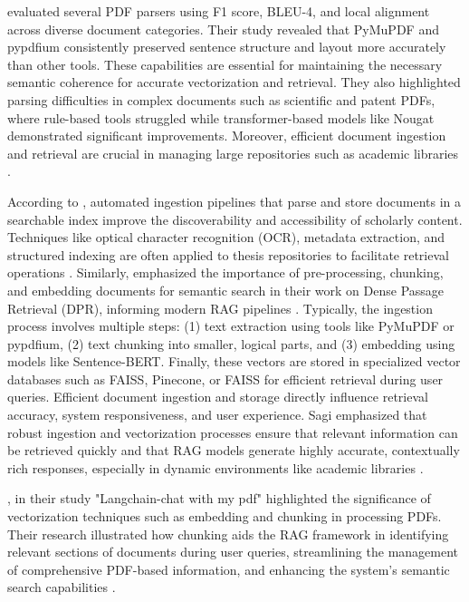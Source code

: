 \begin{refsection}
\bigbreak
\hspace{0.4cm} \citeauthor{adhikari2024comparative} \citeyear{adhikari2024comparative} evaluated several PDF parsers using F1 score, BLEU-4, and local alignment across diverse document categories. Their study revealed that PyMuPDF and pypdfium consistently preserved sentence structure and layout more accurately than other tools. These capabilities are essential for maintaining the necessary semantic coherence for accurate vectorization and retrieval. They also highlighted parsing difficulties in complex documents such as scientific and patent PDFs, where rule-based tools struggled while transformer-based models like Nougat demonstrated significant improvements. Moreover, efficient document ingestion and retrieval are crucial in managing large repositories such as academic libraries \cite{adhikari2024comparative}.

\hspace{0.4cm}According to \citeauthor{zhang2023automated} \citeyear{zhang2023automated}, automated ingestion pipelines that parse and store documents in a searchable index improve the discoverability and accessibility of scholarly content. 
\newpage
\clearpage
Techniques like optical character recognition (OCR), metadata extraction, and structured indexing are often applied to thesis repositories to facilitate retrieval operations \cite{zhang2023automated}. Similarly, \citeauthor{karpukhin2020dense} \citeyear{karpukhin2020dense} emphasized the importance of pre-processing, chunking, and embedding documents for semantic search in their work on Dense Passage Retrieval (DPR), informing modern RAG pipelines \cite{karpukhin2020dense}. Typically, the ingestion process involves multiple steps: (1) text extraction using tools like PyMuPDF or pypdfium, (2) text chunking into smaller, logical parts, and (3) embedding using models like Sentence-BERT. Finally, these vectors are stored in specialized vector databases such as FAISS, Pinecone, or FAISS for efficient retrieval during user queries. Efficient document ingestion and storage directly influence retrieval accuracy, system responsiveness, and user experience. Sagi emphasized that robust ingestion and vectorization processes ensure that relevant information can be retrieved quickly and that RAG models generate highly accurate, contextually rich responses, especially in dynamic environments like academic libraries \cite{karpukhin2020dense}.

\bigbreak
\hspace{0.4cm}\citeauthor{deepak2025langchain} \citeyear{deepak2025langchain}, in their study "Langchain-chat with my pdf" highlighted the significance of vectorization techniques such as embedding and chunking in processing PDFs. Their research illustrated how chunking aids the RAG framework in identifying relevant sections of documents during user queries, streamlining the management of comprehensive PDF-based information, and enhancing the system's semantic search capabilities \cite{deepak2025langchain}.


\end{refsection}
